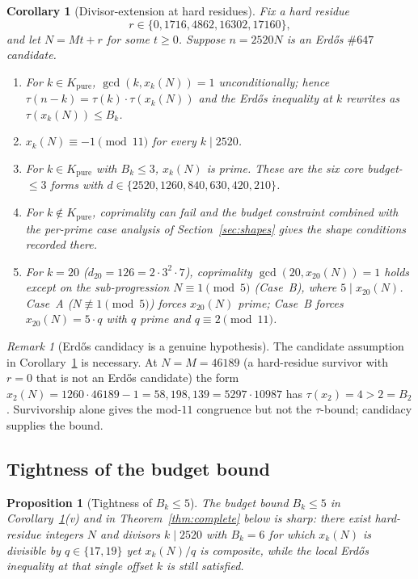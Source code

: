 \documentclass[11pt]{article}
\renewcommand{\_}{\origunderscore\allowbreak}
\newtheorem{proposition}[theorem]{Proposition}
\newtheorem{corollary}[theorem]{Corollary}
\theoremstyle{definition}
\theoremstyle{remark}
\newtheorem{remark}[theorem]{Remark}
\begin{document}
\begin{corollary}[Divisor-extension at hard residues]\label{cor:div_ext}
Fix a hard residue
\[
  r\in\{0,1716,4862,16302,17160\},
\]
and let $N=Mt+r$ for some $t\ge 0$. Suppose $n=2520N$ is an
Erd\H{o}s $\#647$ candidate.
\begin{enumerate}
\item For $k\in K_{\text{pure}}$, $\gcd(k,x_k(N))=1$
unconditionally; hence $\tau(n-k)=\tau(k)\cdot\tau(x_k(N))$ and the
Erd\H{o}s inequality at $k$ rewrites as $\tau(x_k(N))\le B_k$.
\item $x_k(N)\equiv -1\pmod{11}$ for every $k\mid 2520$.
\item For $k\in K_{\text{pure}}$ with $B_k\le 3$, $x_k(N)$ is
prime. These are the six core budget-$\le 3$ forms with
$d\in\{2520,1260,840,630,420,210\}$.
\item For $k\not\in K_{\text{pure}}$, coprimality can fail and the
budget constraint combined with the per-prime case analysis of
Section~\ref{sec:shapes} gives the shape conditions recorded there.
\item For $k=20$ ($d_{20}=126=2\cdot 3^2\cdot 7$), coprimality
$\gcd(20,x_{20}(N))=1$ holds except on the sub-progression
$N\equiv 1\pmod 5$ (Case~B), where $5\mid x_{20}(N)$. Case~A
($N\not\equiv 1\pmod 5$) forces $x_{20}(N)$ prime; Case~B forces
$x_{20}(N)=5\cdot q$ with $q$ prime and $q\equiv 2\pmod{11}$.
\end{enumerate}
\end{corollary}

\begin{remark}[Erd\H{o}s candidacy is a genuine hypothesis]
The candidate assumption in Corollary~\ref{cor:div_ext} is necessary.
At $N=M=46189$ (a hard-residue survivor with $r=0$ that is not an
Erd\H{o}s candidate) the form
$x_2(N)=1260\cdot 46189-1=58{,}198{,}139=5297\cdot 10987$
has $\tau(x_2)=4>2=B_2$. Survivorship alone gives the mod-$11$
congruence but not the $\tau$-bound; candidacy supplies the bound.
\end{remark}

\subsection{Tightness of the budget bound}

\begin{proposition}[Tightness of $B_k\le 5$]\label{prop:tight}
The budget bound $B_k\le 5$ in Corollary~\ref{cor:div_ext}(v) and
in Theorem~\ref{thm:complete} below is sharp: there exist
hard-residue integers $N$ and divisors $k\mid 2520$
with $B_k=6$ for which $x_k(N)$ is divisible by $q\in\{17,19\}$
yet $x_k(N)/q$ is composite, while the local Erd\H{o}s inequality at
that single offset $k$ is still satisfied.
\end{proposition}
\end{document}

